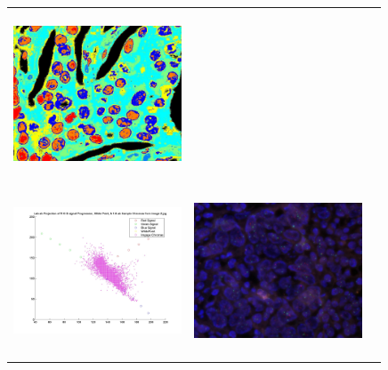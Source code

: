 \begin{tabular}{ |c|c|c| }
\includegraphics[width=5.0cm,height=5.0cm]{images/Her2Fish/2_RGB_LabelImg.jpg}   \\
\includegraphics[width=5.0cm,height=5.0cm]{images/Her2Fish/2_SampleChromas.jpg}   &
\includegraphics[width=5.0cm,height=5.0cm]{images/Her2Fish/3.jpg}
\end{tabular}


